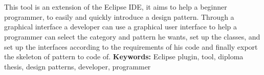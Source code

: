 \chapter*{\csebilabstract}
\addstarredchapter{\csebilabstract} %
\makecsebilabstract
This tool is an extension of the Eclipse IDE, it aims to help a beginner programmer, 
to easily and quickly introduce a design pattern. Through a graphical interface a developer can use 
a graphical user interface to help a programmer can select the category and pattern he wants, set up the classes, 
and set up the interfaces according to the requirements of his code and finally export the skeleton of pattern to code of.
\linebreak
\linebreak
\textbf{Keywords:} Eclipse plugin, tool, diploma thesis, design patterns, developer, programmer